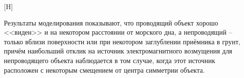 \documentclass[a4paper,14pt]{article}
\makeatletter
\renewenvironment{figure}[1][\fps@figure]{
  \edef\@tempa{\noexpand\@float{figure}[#1]}
  \@tempa
  \addtocounter{foofigure}{1}
}{
  \end@float
}
\renewcommand{\Re}{\mathop{\mathrm{Re}}\nolimits}
\makeatother
\begin{document}
\begin{figure}[H]
	\centering
	\text{~~}
	\caption{$\Re(\mathbf{E}_z)$ при $l_2=-300$}
	\label{fig:res3:300_EzR}
\end{figure}


Результаты моделирования показывают, что проводящий объект хорошо <<виден>> и на некотором расстоянии от морского дна, а непроводящий -- только вблизи поверхности или при некотором заглублении приёмника в грунт, причём наибольший отклик на источник электромагнитного возмущения для непроводящего объекта наблюдается в том случае, когда этот источник расположен с некоторым смещением от центра симметрии объекта.
\end{document}
